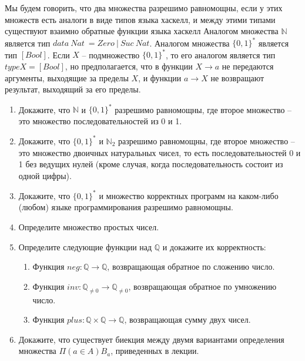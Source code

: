 

Мы будем говорить, что два множества разрешимо равномощны, если у этих множеств есть аналоги в виде типов языка хаскелл,
    и между этими типами существуют взаимно обратные функции языка хаскелл
Аналогом множества $\mathbb{N}$ является тип $data\ Nat\ = Zero\ |\ Suc\ Nat$.
Аналогом множества $\{0,1\}^*$ является тип $[Bool]$.
Если $X$ -- подмножество $\{0,1\}^*$, то его аналогом является тип $type X = [Bool]$, но предполагается,
    что в функции $X \to a$ не передаются аргументы, выходящие за пределы $X$, и функции $a \to X$ не возвращают результат, выходящий за его пределы.

\begin{enumerate}

\item Докажите, что $\mathbb{N}$ и $\{0,1\}^*$ разрешимо равномощны, где второе множество -- это множество последовательностей из 0 и 1.

\item Докажите, что $\{0,1\}^*$ и $\mathbb{N}_2$ разрешимо равномощны, где второе множество -- это множество двоичных натуральных чисел,
    то есть последовательностей 0 и 1 без ведущих нулей (кроме случая, когда последовательность состоит из одной цифры).

\item Докажите, что $\{0,1\}^*$ и множество корректных программ на каком-либо (любом) языке программирования разрешимо равномощны.

\item Определите множество простых чисел.

\item Определите следующие функции над $\mathbb{Q}$ и докажите их корректность:
\begin{enumerate}
\item Функция $neg : \mathbb{Q} \to \mathbb{Q}$, возвращающая обратное по сложению число.
\item Функция $inv : \mathbb{Q}_{\neq 0} \to \mathbb{Q}_{\neq 0}$, возвращающая обратное по умножению число.
\item Функция $plus : \mathbb{Q} \times \mathbb{Q} \to \mathbb{Q}$, возвращающая сумму двух чисел.
\end{enumerate}

\item Докажите, что существует биекция между двумя вариантами определения множества $\Pi (a \in A) B_a$, приведенных в лекции.


\end{enumerate}
